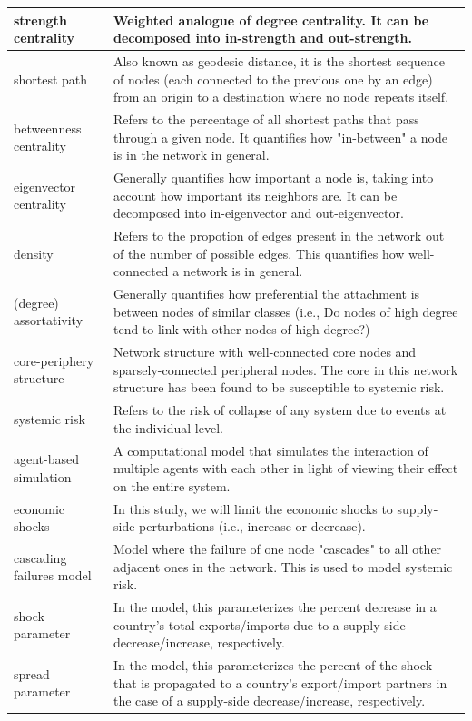 \documentclass[12pt,letterpaper]{report}
\begin{document}
\begin{longtable}{|p{5cm}|p{8cm}|}
	\hline
	strength centrality & Weighted analogue of degree centrality. It can be decomposed into in-strength and out-strength. \\
	\hline
	shortest path & Also known as geodesic distance, it is the shortest sequence of nodes (each connected to the previous one by an edge) from an origin to a destination where no node repeats itself. \\
	\hline
	betweenness centrality & Refers to the percentage of all shortest paths that pass through a given node. It quantifies how "in-between" a node is in the network in general. \\
	\hline
	eigenvector centrality & Generally quantifies how important a node is, taking into account how important its neighbors are. It can be decomposed into in-eigenvector and out-eigenvector. \\
	\hline
	density & Refers to the propotion of edges present in the network out of the number of possible edges. This quantifies how well-connected a network is in general. \\
	\hline
	(degree) assortativity & Generally quantifies how preferential the attachment is between nodes of similar classes (i.e., Do nodes of high degree tend to link with other nodes of high degree?) \\
	\hline
	core-periphery structure & Network structure with well-connected core nodes and sparsely-connected peripheral nodes. The core in this network structure has been found to be susceptible to systemic risk. \\
	\hline
	systemic risk & Refers to the
	risk of collapse of any system due to events at the individual level. \\
	\hline
	agent-based simulation & A computational model that simulates the interaction of multiple agents with each other in light of viewing their effect on the entire system. \\
	\hline
	economic shocks & In this study, we will limit the economic shocks to supply-side perturbations (i.e., increase or decrease). \\
	\hline
	cascading failures model & Model where the failure of one node "cascades" to all other adjacent ones in the network. This is used to model systemic risk. \\
	\hline
	shock parameter & In the model, this parameterizes the percent decrease in a country's total exports/imports due to a supply-side decrease/increase, respectively. \\
	\hline
	spread parameter & In the model, this parameterizes the percent of the shock that is propagated to a country's export/import partners in the case of a supply-side decrease/increase, respectively. \\

\end{longtable}
\end{document}
